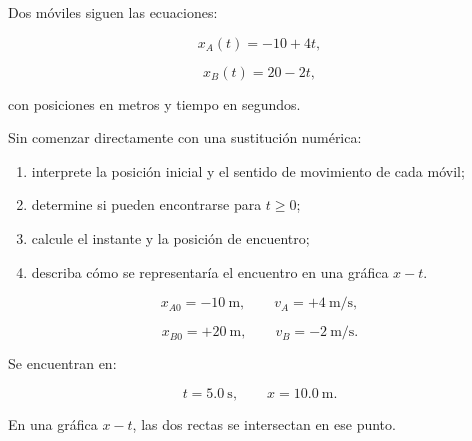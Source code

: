\begin{ejercicio}
Dos móviles siguen las ecuaciones:

\[
x_A(t)=-10+4t,
\]

\[
x_B(t)=20-2t,
\]

con posiciones en metros y tiempo en segundos.

Sin comenzar directamente con una sustitución numérica:

\begin{enumerate}[label=\alph*)]
    \item interprete la posición inicial y el sentido de movimiento de cada móvil;
    \item determine si pueden encontrarse para \(t\geq0\);
    \item calcule el instante y la posición de encuentro;
    \item describa cómo se representaría el encuentro en una gráfica \(x-t\).
\end{enumerate}
\end{ejercicio}

\begin{respuesta}
\[
x_{A0}=-\SI{10}{\meter},
\qquad
v_A=+\SI{4}{\meter\per\second},
\]

\[
x_{B0}=+\SI{20}{\meter},
\qquad
v_B=-\SI{2}{\meter\per\second}.
\]

Se encuentran en:

\[
\boxed{t=\SI{5.0}{\second}},
\qquad
\boxed{x=\SI{10.0}{\meter}}.
\]

En una gráfica \(x-t\), las dos rectas se intersectan en ese punto.
\end{respuesta}

